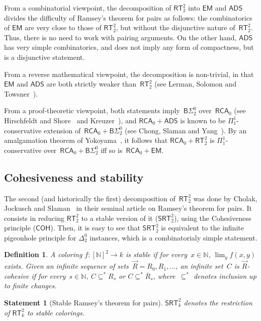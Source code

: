 \documentclass{article}
\numberwithin{theorem}{section}
\newtheorem{statement}[theorem]{Statement}
\newtheorem{definition}[theorem]{Definition}
\newcommand{\RCA}{\mathsf{RCA}}
\newcommand{\SRT}{\mathsf{SRT}}
\newcommand{\EM}{\mathsf{EM}}
\newcommand{\ADS}{\mathsf{ADS}}
\newcommand{\COH}{\mathsf{COH}}
\newcommand{\BSig}{\mathsf{B}\Sigma^0}
\newcommand{\RT}{\mathsf{RT}}
\newcommand{\NN}{\mathbb{N}}
\begin{document}
From a combinatorial viewpoint, the decomposition of $\RT^2_2$ into $\EM$ and $\ADS$ divides the difficulty of Ramsey's theorem for pairs as follows: the combinatorics of $\EM$ are very close to those of $\RT^2_2$, but without the disjunctive nature of~$\RT^2_2$. Thus, there is no need to work with pairing arguments. On the other hand, $\ADS$ has very simple combinatorics, and does not imply any form of compactness, but is a disjunctive statement.

From a reverse mathematical viewpoint, the decomposition is non-trivial, in that $\EM$ and $\ADS$ are both strictly weaker than~$\RT^2_2$ (see Lerman, Solomon and Towsner~\cite{lerman2013separating}).

From a proof-theoretic viewpoint, both statements imply~$\BSig_2$ over~$\RCA_0$ (see Hirschfeldt and Shore~\cite[Proposition 4.5]{Hirschfeldt2007CombinatorialPW} and Kreuzer~\cite[Proposition 16]{kreuzer2012primitive}), and $\RCA_0 + \ADS$ is known to be $\Pi^1_1$-conservative extension of~$\RCA_0 + \BSig_2$ (see Chong, Slaman and Yang~\cite{chong2021pi11}). By an amalgamation theorem of Yokoyama~\cite{yokoyama2010conservativity}, it follows that $\RCA_0 + \RT^2_2$ is $\Pi^1_1$-conservative over~$\RCA_0 + \BSig_2$ iff so is~$\RCA_0 + \EM$.

\subsection{Cohesiveness and stability}

The second (and historically the first) decomposition of~$\RT^2_2$ was done by Cholak, Jockusch and Slaman~\cite{cholak_jockusch_slaman_2001}
in their seminal article on Ramsey's theorem for pairs. It consists in reducing $\RT^2_2$ to a stable version of it ($\SRT^2_2$), using the Cohesiveness principle ($\COH$). Then, it is easy to see that $\SRT^2_2$ is equivalent to the infinite pigeonhole principle for $\Delta^0_2$ instances, which is a combinatorialy simple statement.

\begin{definition}
A coloring $f : [\NN]^2 \to k$ is \emph{stable} if for every~$x \in \NN$, $\lim_y f(x, y)$ exists. Given an infinite sequence of sets~$\vec{R} = R_0, R_1, \dots$, an infinite set~$C$ is \emph{$\vec{R}$-cohesive} if for every~$s \in \NN$, $C \subseteq^{*} R_s$ or $C \subseteq^{*} \overline{R}_s$, where~$\subseteq^{*}$ denotes inclusion up to finite changes.
\end{definition}

\begin{statement}[Stable Ramsey's theorem for pairs]
$\SRT^2_k$ denotes the restriction of $\RT^2_k$ to stable colorings.
\end{statement}
\end{document}
